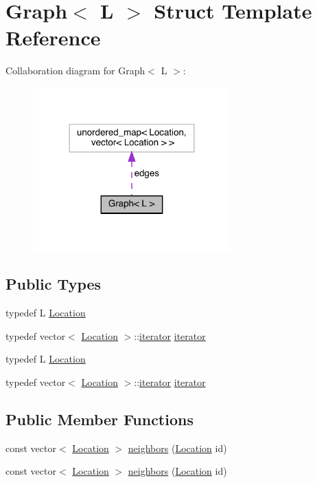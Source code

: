 \hypertarget{struct_graph}{}\section{Graph$<$ L $>$ Struct Template Reference}
\label{struct_graph}


Collaboration diagram for Graph$<$ L $>$\+:\nopagebreak
\begin{figure}[H]
\begin{center}
\leavevmode
\includegraphics[width=216pt]{struct_graph__coll__graph}
\end{center}
\end{figure}
\subsection*{Public Types}
\begin{DoxyCompactItemize}
\item 
typedef L \hyperlink{struct_graph_aea7d42bb67163fe692353674435a1426}{Location}
\item 
typedef vector$<$ \hyperlink{struct_graph_aea7d42bb67163fe692353674435a1426}{Location} $>$\+::\hyperlink{struct_graph_af43d6412d7a6034eaeacde8ca1c1d984}{iterator} \hyperlink{struct_graph_af43d6412d7a6034eaeacde8ca1c1d984}{iterator}
\item 
typedef L \hyperlink{struct_graph_aea7d42bb67163fe692353674435a1426}{Location}
\item 
typedef vector$<$ \hyperlink{struct_graph_aea7d42bb67163fe692353674435a1426}{Location} $>$\+::\hyperlink{struct_graph_af43d6412d7a6034eaeacde8ca1c1d984}{iterator} \hyperlink{struct_graph_af43d6412d7a6034eaeacde8ca1c1d984}{iterator}
\end{DoxyCompactItemize}
\subsection*{Public Member Functions}
\begin{DoxyCompactItemize}
\item 
const vector$<$ \hyperlink{struct_graph_aea7d42bb67163fe692353674435a1426}{Location} $>$ \hyperlink{struct_graph_a8389c308ee673e63d574e0a30191662e}{neighbors} (\hyperlink{struct_graph_aea7d42bb67163fe692353674435a1426}{Location} id)
\item 
const vector$<$ \hyperlink{struct_graph_aea7d42bb67163fe692353674435a1426}{Location} $>$ \hyperlink{struct_graph_a8389c308ee673e63d574e0a30191662e}{neighbors} (\hyperlink{struct_graph_aea7d42bb67163fe692353674435a1426}{Location} id)
\end{DoxyCompactItemize}
